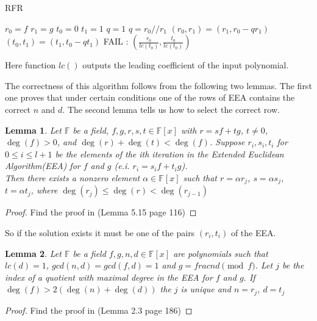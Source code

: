 \documentclass[12pt]{article}
\newtheorem{lemma}{Lemma}
\begin{document}
\begin{algorithm}
\caption{RFR}\label{RFR}
\begin{algorithmic}[1]
    \State $r_0 = f$  $r_1 = g$
    \State $t_0 = 0$  $t_1 = 1$
    \State $q = 1$
        \State $q = r_0 // r_1$
        \State $(r_0, r_1) = (r_1, r_0 - qr_1)$
        \State $(t_0, t_1) = (t_1, t_0 - qt_1)$
    \EndWhile
        \State \Return FAIL
    \Else:
            \State \Return  $(\frac{r_0}{lc(t_0)}, \frac{t_0}{lc(t_0)})$
    \EndIf
\EndProcedure
\end{algorithmic}
\end{algorithm}
Here function $lc()$ outputs the leading coefficient of the input polynomial.


The correctness of this algorithm follows from the following two lemmas. The first one proves that under certain conditions one of the rows of EEA contains the correct $n$ and $d$. The second lemma tells us how to select the correct row.

\begin{lemma}
Let $\mathbb{F}$ be a field, $f, g, r, s, t \in \mathbb{F}[x]$ with $r = sf + tg$, $t \neq 0$, $\deg(f) > 0$, and $\deg(r) + \deg(t) <\deg(f)$.
Suppose $r_i, s_i, t_i$ for $0 \leq i \leq l + 1$ be the elements of the ith iteration in the Extended Euclidean Algorithm(EEA) for $f$ and $g$ (e.i. $r_i = s_if + t_ig$). \\
Then there exists a nonzero element $\alpha \in \mathbb{F}[x]$ such that $r = \alpha r_j$, $s = \alpha s_j$, $t = \alpha t_j$, where $\deg(r_j) \leq \deg(r) < \deg(r_{j-1})$
\end{lemma}
\begin{proof}
Find the proof in \cite{[GG13]} (Lemma 5.15 page 116)
\end{proof}

So if the solution exists it must be one of the pairs $(r_i, t_i)$ of the EEA.

\begin{lemma}
Let $\mathbb{F}$ be a field $f,g,n,d \in \mathbb{F}[x]$ are polynomials such that $lc(d) = 1$, $gcd(n,d) = gcd(f,d) = 1$ and $g = frac{n}{d} \pmod{f}$. Let $j$ be the index of a quotient with maximal degree in the EEA for $f$ and $g$. If $\deg(f) > 2(\deg(n) + \deg(d))$ the $j$ is unique and $n = r_j$, $d = t_j$
\end{lemma}
\begin{proof}
Find the proof in \cite{[KM06]} (Lemma 2.3 page 186)
\end{proof}
\end{document}
